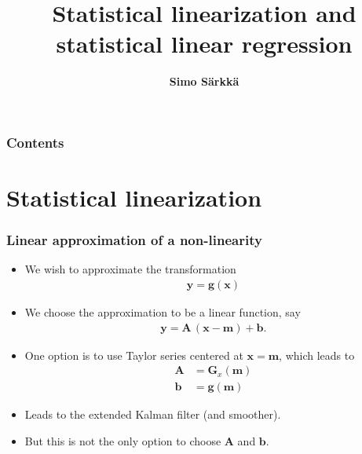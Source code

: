 \documentclass[first=dgreen,second=purple,presentation]{elecslides}
\title{Statistical linearization and statistical linear regression}
\author{{\bf Simo S\"arkk\"a}}
\institute{Aalto University, Finland}
\date{}
\newcommand{\mbf}[1]{\mathbf{#1}}
\newcommand{\vb}{\mbf{b}}
\newcommand{\vg}{\mbf{g}}
\newcommand{\vm}{\mbf{m}}
\newcommand{\vx}{\mbf{x}}
\newcommand{\vy}{\mbf{y}}
\newcommand{\MA}{\mbf{A}}
\newcommand{\MG}{\mbf{G}}
\begin{document}

\aaltotitleframe

\begin{frame}
  \frametitle{Contents}
  \tableofcontents[pausesections]
\end{frame}


\section{Statistical linearization}

\begin{frame}
 \frametitle{Linear approximation of a non-linearity}

\begin{itemize}[<+->]
\item We wish to approximate the \alert{transformation}
%
\begin{equation}
\begin{split}
  \vy = \vg(\vx)
\end{split}
\nonumber
\end{equation}

\item We choose the approximation to be a \alert{linear function}, say
%
\begin{equation}
\begin{split}
  \vy = \MA \, (\vx - \vm) + \vb.
\end{split}
\nonumber
\end{equation}

\item One option is to use \alert{Taylor series} centered at $\vx = \vm$, which leads to
%
\begin{equation}
\begin{split}
  \MA &= \MG_x(\vm) \\
  \vb &= \vg(\vm)
\end{split}
\nonumber
\end{equation}
%
\item Leads to the \alert{extended Kalman filter} (and smoother).

\item But this is not the only option to choose $\MA$ and $\vb$.
\end{itemize}
\end{frame}
\end{document}
